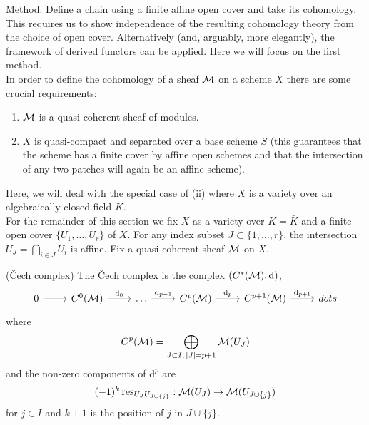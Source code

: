 \documentclass[a4paper,11pt]{article}
\begin{document}
			\noindent Method: Define a chain using a finite affine open cover and take its cohomology. This requires us to show independence of the resulting cohomology theory from the choice of open cover. Alternatively (and, arguably, more elegantly), the framework of derived functors can be applied. Here we will focus on the first method.
			\\

			\noindent In order to define the cohomology of a sheaf $\mathcal{M}$ on a scheme $X$ there are some crucial requirements:
			\begin{enumerate}
				\item $\mathcal{M}$ is a quasi-coherent sheaf of modules.
				\item $X$ is quasi-compact and separated over a base scheme $S$ (this guarantees that the scheme has a finite cover by affine open schemes and that the intersection of any two patches will again be an affine scheme).
			\end{enumerate}
			Here, we will deal with the special case of (ii) where $X$ is a variety over an algebraically closed field $K$.
			\\

			\noindent For the remainder of this section we fix $X$ as a variety over $K=\bar{K}$ and a finite open cover $\{U_1,\dots,U_r\}$ of $X$. For any index subset $J\subset\{1,\dots,r\}$, the intersection $U_J=\bigcap_{i\in J}U_i$ is affine. Fix a quasi-coherent sheaf $\mathcal{M}$ on $X$.

			\begin{defi}
				({\v C}ech complex) The {\v C}ech complex is the complex $(C^\ast(\mathcal{M}),\mathrm{d})$,
				\begin{equation*}
					\begin{tikzcd}
						0\ar[r] & C^0(\M)\ar[r,"\mathrm{d}_0"] & \dots \ar[r,"\mathrm{d}_{p-1}"] & C^p(\M)\ar[r,"\mathrm{d}_p"] & C^{p+1}(\M)\ar[r,"\mathrm{d}_{p+1}"] & 
						dots 
					\end{tikzcd}
				\end{equation*}
				where 
				\begin{equation*}
					C^p(\mathcal{M})=\bigoplus_{J\subset I,\,|J|=p+1}\mathcal{M}(U_J)
				\end{equation*}
				and the non-zero components of $\mathrm{d}^p$ are
				\begin{equation*}
					(-1)^k\,\mathrm{res}_{U_JU_{J\cup\{j\}}}:\mathcal{M}(U_J)\rightarrow\mathcal{M}(U_{J\cup\{j\}})
				\end{equation*}
				for $j\in I$ and $k+1$ is the position of $j$ in $J\cup\{j\}$.
			\end{defi}
\end{document}
